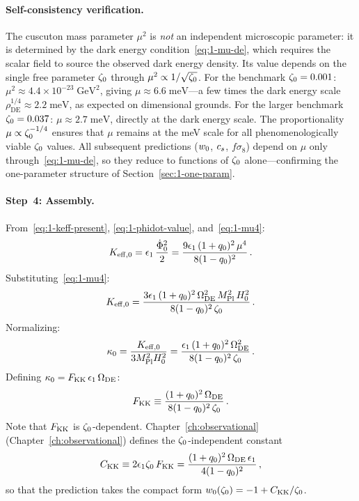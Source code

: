 \paragraph{Self-consistency verification.} The cuscuton mass parameter $\mu^2$ is \emph{not} an independent microscopic parameter: it is determined by the dark energy condition~\eqref{eq:1-mu-de}, which requires the scalar field to source the observed dark energy density. Its value depends on the single free parameter $\zeta_0$ through $\mu^2 \propto 1/\sqrt{\zeta_0}$. For the benchmark $\zeta_0 = 0.001$: $\mu^2 \approx 4.4 \times 10^{-23}\;\mathrm{GeV}^2$, giving $\mu \approx 6.6\;\mathrm{meV}$---a few times the dark energy scale $\rho_{\mathrm{DE}}^{1/4} \approx 2.2\;\mathrm{meV}$, as expected on dimensional grounds. For the larger benchmark $\zeta_0 = 0.037$: $\mu \approx 2.7\;\mathrm{meV}$, directly at the dark energy scale. The proportionality $\mu \propto \zeta_0^{-1/4}$ ensures that $\mu$ remains at the meV scale for all phenomenologically viable $\zeta_0$ values. All subsequent predictions ($w_0$, $c_s$, $f\sigma_8$) depend on $\mu$ only through~\eqref{eq:1-mu-de}, so they reduce to functions of $\zeta_0$ alone---confirming the one-parameter structure of Section~\ref{sec:1-one-param}.

\paragraph{Step~4: Assembly.} From~\eqref{eq:1-keff-present}, \eqref{eq:1-phidot-value}, and~\eqref{eq:1-mu4}:
\begin{equation}
\label{eq:1-keff-assembled}
K_{\mathrm{eff},0} = \epsilon_1\,\frac{\dot\Phi_0^2}{2} = \frac{9\epsilon_1\,(1+q_0)^2\,\mu^4}{8(1 - q_0)^2}\,.
\end{equation}
Substituting~\eqref{eq:1-mu4}:
\begin{equation}
\label{eq:1-keff-substituted}
K_{\mathrm{eff},0} = \frac{3\epsilon_1\,(1+q_0)^2\,\Omega_{\mathrm{DE}}^2\, M_{\mathrm{Pl}}^2\, H_0^2}{8(1 - q_0)^2\,\zeta_0}\,.
\end{equation}
Normalizing:
\begin{equation}
\label{eq:1-kappa0}
\kappa_0 = \frac{K_{\mathrm{eff},0}}{3M_{\mathrm{Pl}}^2 H_0^2} = \frac{\epsilon_1\,(1+q_0)^2\,\Omega_{\mathrm{DE}}^2}{8(1 - q_0)^2\,\zeta_0}\,.
\end{equation}
Defining $\kappa_0 = F_{\mathrm{KK}}\,\epsilon_1\,\Omega_{\mathrm{DE}}$:
\begin{equation}
\label{eq:1-fkk}
F_{\mathrm{KK}} \equiv \frac{(1+q_0)^2\,\Omega_{\mathrm{DE}}}{8(1 - q_0)^2\,\zeta_0}\,.
\end{equation}
Note that $F_{\mathrm{KK}}$ is $\zeta_0$-dependent. Chapter~\ref{ch:observational} (Chapter~\ref{ch:observational}) defines the $\zeta_0$-independent constant
\begin{equation}
\label{eq:1-ckk-bridge}
C_{\mathrm{KK}} \equiv 2\epsilon_1\zeta_0\,F_{\mathrm{KK}} = \frac{(1+q_0)^2\,\Omega_{\mathrm{DE}}\,\epsilon_1}{4(1-q_0)^2}\,,
\end{equation}
so that the prediction takes the compact form $w_0(\zeta_0) = -1 + C_{\mathrm{KK}}/\zeta_0$.

